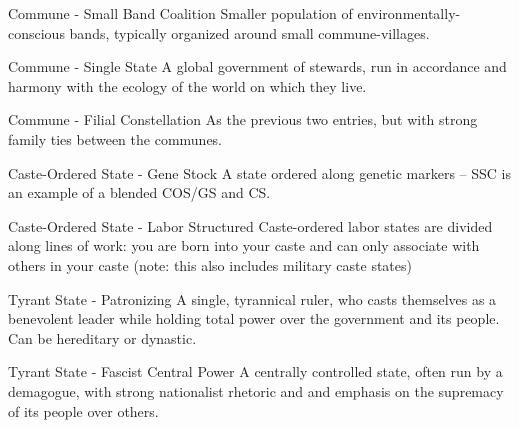  Commune - Small Band Coalition                        Smaller population of environmentally- 
                                                       conscious bands, typically organized around  
                                                       small commune-villages.   

 Commune - Single State                                A global government of stewards, run in  
                                                       accordance and harmony with the ecology of  
                                                       the world on which they live.  

 Commune - Filial Constellation                        As the previous two entries, but with strong  
                                                       family ties between the communes.  

 Caste-Ordered State - Gene Stock                      A state ordered along genetic markers -- SSC  
                                                       is an example of a blended COS/GS and CS. 

                                                                                                           


 Caste-Ordered State - Labor Structured                Caste-ordered labor states are divided along  
                                                       lines of work: you are born into your caste  
                                                       and can only associate with others in your  
                                                       caste (note: this also includes military caste  
                                                       states) 

 Tyrant State - Patronizing                            A single, tyrannical ruler, who casts  
                                                       themselves as a benevolent leader while  
                                                       holding total power over the government and  
                                                       its people. Can be hereditary or dynastic.  

 Tyrant State - Fascist Central Power                  A centrally controlled state, often run by a  
                                                       demagogue, with strong nationalist rhetoric  
                                                       and and emphasis on the supremacy of its  
                                                       people over others.   

